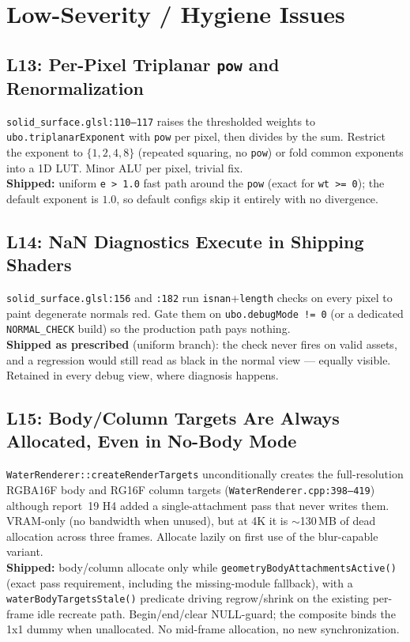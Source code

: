 \documentclass[11pt,a4paper]{article}
\begin{document}
\section{Low-Severity / Hygiene Issues}

\subsection{L13: Per-Pixel Triplanar \texttt{pow} and Renormalization}
\label{sec:l13}

\texttt{solid\_surface.glsl:110--117} raises the thresholded weights to
\texttt{ubo.triplanarExponent} with \texttt{pow} per pixel, then divides by
the sum. Restrict the exponent to $\{1, 2, 4, 8\}$ (repeated squaring, no
\texttt{pow}) or fold common exponents into a 1D LUT. Minor ALU per pixel,
trivial fix. \\ \textbf{Shipped:} uniform \texttt{e > 1.0} fast path around
the \texttt{pow} (exact for \texttt{wt >= 0}); the default exponent is $1.0$,
so default configs skip it entirely with no divergence.

\subsection{L14: NaN Diagnostics Execute in Shipping Shaders}
\label{sec:l14}

\texttt{solid\_surface.glsl:156} and \texttt{:182} run
\texttt{isnan}+\texttt{length} checks on every pixel to paint degenerate
normals red. Gate them on \texttt{ubo.debugMode != 0} (or a dedicated
\texttt{NORMAL\_CHECK} build) so the production path pays nothing.
\\ \textbf{Shipped as prescribed} (uniform branch): the check never fires
on valid assets, and a regression would still read as black in the normal
view --- equally visible. Retained in every debug view, where diagnosis
happens.

\subsection{L15: Body/Column Targets Are Always Allocated, Even in No-Body Mode}
\label{sec:l15}

\texttt{WaterRenderer::createRenderTargets} unconditionally creates the
full-resolution RGBA16F body and RG16F column targets
(\texttt{WaterRenderer.cpp:398--419}) although report~19 H4 added a
single-attachment pass that never writes them. VRAM-only (no bandwidth when
unused), but at 4K it is $\sim$130\,MB of dead allocation across three
frames. Allocate lazily on first use of the blur-capable variant.
\\ \textbf{Shipped:} body/column allocate only while
\texttt{geometryBodyAttachmentsActive()} (exact pass requirement, including
the missing-module fallback), with a \texttt{waterBodyTargetsStale()}
predicate driving regrow/shrink on the existing per-frame idle recreate
path. Begin/end/clear NULL-guard; the composite binds the 1x1 dummy when
unallocated. No mid-frame allocation, no new synchronization.
\end{document}
